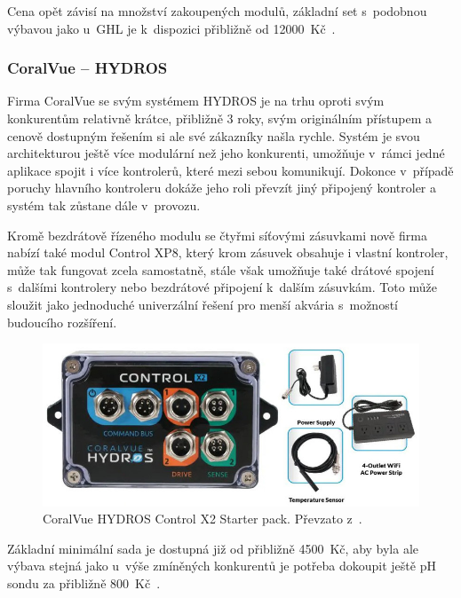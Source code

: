             Cena opět závisí na množství zakoupených modulů, základní set s~podobnou výbavou jako u~GHL je k~dispozici přibližně od \qty{12000}{Kč}~\cite{neptune-systems-why-apex,eshop-neptune-systems-apex}.

        \subsubsection{CoralVue -- HYDROS}
            Firma CoralVue se svým systémem HYDROS je na trhu oproti svým konkurentům relativně krátce, přibližně 3 roky, svým originálním přístupem a cenově dostupným řešením si ale své zákazníky našla rychle. Systém je svou architekturou ještě více modulární než jeho konkurenti, umožňuje v~rámci jedné aplikace spojit i více kontrolerů, které mezi sebou komunikují. Dokonce v~případě poruchy hlavního kontroleru dokáže jeho roli převzít jiný připojený kontroler a systém tak zůstane dále v~provozu. 
            
            Kromě bezdrátově řízeného modulu se čtyřmi síťovými zásuvkami nově firma nabízí také modul Control XP8, který krom zásuvek obsahuje i vlastní kontroler, může tak fungovat zcela samostatně, stále však umožňuje také drátové spojení s~dalšími kontrolery nebo bezdrátové připojení k~dalším zásuvkám. Toto může sloužit jako jednoduché univerzální řešení pro menší akvária s~možností budoucího rozšíření. 

            \begin{figure}[h!]
                \centering
                \includegraphics[width=\textwidth]{obrazky/trh/hydros-x2-starter-pack.jpg}
                \caption{CoralVue HYDROS Control X2 Starter pack. Převzato z~\cite{eshop-coralvue-hydros}.}
                \label{fig:obrazky-trh-hydros-x2-starter-pack-jpg}
            \end{figure}
            
            Základní minimální sada je dostupná již od přibližně \qty{4500}{Kč}, aby byla ale výbava stejná jako u~výše zmíněných konkurentů je potřeba dokoupit ještě pH sondu za přibližně \qty{800}{Kč}~\cite{coralvuehydros,eshop-coralvue-hydros}.
            
